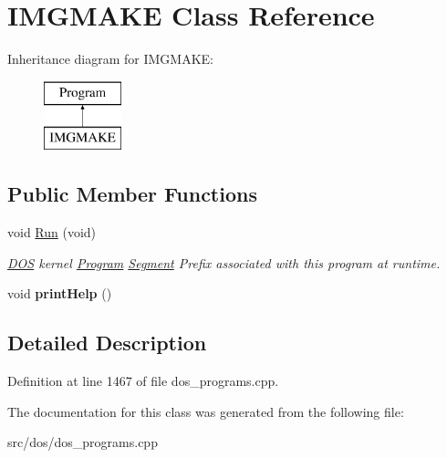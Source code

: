 \hypertarget{classIMGMAKE}{\section{I\-M\-G\-M\-A\-K\-E Class Reference}
\label{classIMGMAKE}
}
Inheritance diagram for I\-M\-G\-M\-A\-K\-E\-:\begin{figure}[H]
\begin{center}
\leavevmode
\includegraphics[height=2.000000cm]{classIMGMAKE}
\end{center}
\end{figure}
\subsection*{Public Member Functions}
\begin{DoxyCompactItemize}
\item 
\hypertarget{classIMGMAKE_afbd2116356dab83d08b978c72ee74340}{void \hyperlink{classIMGMAKE_afbd2116356dab83d08b978c72ee74340}{Run} (void)}\label{classIMGMAKE_afbd2116356dab83d08b978c72ee74340}

\begin{DoxyCompactList}\small\item\em \hyperlink{classDOS}{D\-O\-S} kernel \hyperlink{classProgram}{Program} \hyperlink{structSegment}{Segment} Prefix associated with this program at runtime. \end{DoxyCompactList}\item 
\hypertarget{classIMGMAKE_aed2e86f96068d3380ddc72eb78377938}{void {\bfseries print\-Help} ()}\label{classIMGMAKE_aed2e86f96068d3380ddc72eb78377938}

\end{DoxyCompactItemize}


\subsection{Detailed Description}


Definition at line 1467 of file dos\-\_\-programs.\-cpp.



The documentation for this class was generated from the following file\-:\begin{DoxyCompactItemize}
\item 
src/dos/dos\-\_\-programs.\-cpp\end{DoxyCompactItemize}

